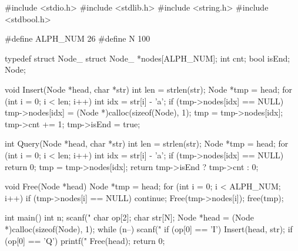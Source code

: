 \begin{mycpptwocol}[链表形式的Trie]
    #include <stdio.h>
    #include <stdlib.h>
    #include <string.h>
    #include <stdbool.h>

    #define ALPH_NUM 26
    #define N 100

    typedef struct Node_ {
        struct Node_ *nodes[ALPH_NUM];
        int cnt;
        bool isEnd;
    } Node;

    void Insert(Node *head, char *str) {
        int len = strlen(str);
        Node *tmp = head;
        for (int i = 0; i < len; i++) {
            int idx = str[i] - 'a';
            if (tmp->nodes[idx] == NULL) {
                tmp->nodes[idx] = (Node *)calloc(sizeof(Node), 1);
            }
            tmp = tmp->nodes[idx];
        }
        tmp->cnt += 1;
        tmp->isEnd = true;
    }

    int Query(Node *head, char *str) {
        int len = strlen(str);
        Node *tmp = head;
        for (int i = 0; i < len; i++) {
            int idx = str[i] - 'a';
            if (tmp->nodes[idx] == NULL) {
                return 0;
            }
            tmp = tmp->nodes[idx];
        }
        return tmp->isEnd ? tmp->cnt : 0;
    }

    void Free(Node *head) {
        Node *tmp = head;
        for (int i = 0; i < ALPH_NUM; i++) {
            if (tmp->nodes[i] == NULL) {
                continue;
            }
            Free(tmp->nodes[i]);
        }
        free(tmp);
    }

    int main() {
        int n;
        scanf("%
        char op[2];
        char str[N];
        Node *head = (Node *)calloc(sizeof(Node), 1);
        while (n--) {
            scanf("%
            if (op[0] == 'I') {
                Insert(head, str);
            }
            if (op[0] == 'Q') {
                printf("%
            }
        }
        Free(head);
        return 0;
    }
\end{mycpptwocol}

